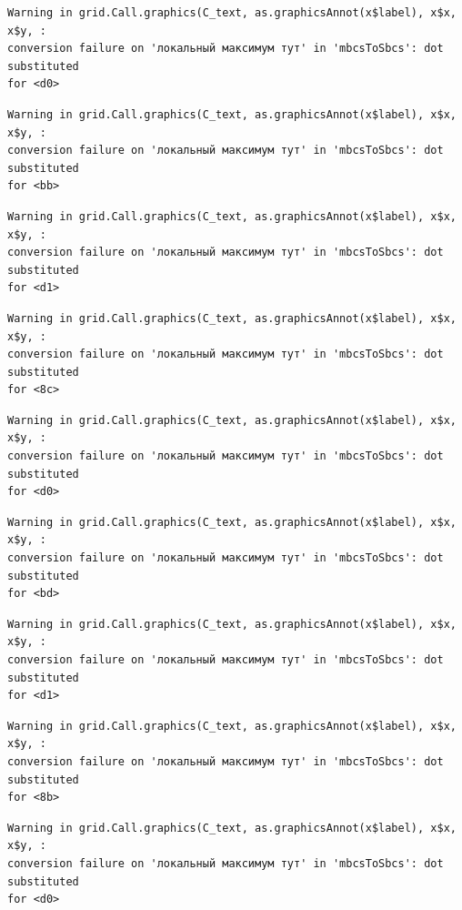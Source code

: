 \documentclass[
  letterpaper,
]{scrbook}
\theoremstyle{definition}
\theoremstyle{remark}
\begin{document}
\begin{verbatim}
Warning in grid.Call.graphics(C_text, as.graphicsAnnot(x$label), x$x, x$y, :
conversion failure on 'локальный максимум тут' in 'mbcsToSbcs': dot substituted
for <d0>
\end{verbatim}

\begin{verbatim}
Warning in grid.Call.graphics(C_text, as.graphicsAnnot(x$label), x$x, x$y, :
conversion failure on 'локальный максимум тут' in 'mbcsToSbcs': dot substituted
for <bb>
\end{verbatim}

\begin{verbatim}
Warning in grid.Call.graphics(C_text, as.graphicsAnnot(x$label), x$x, x$y, :
conversion failure on 'локальный максимум тут' in 'mbcsToSbcs': dot substituted
for <d1>
\end{verbatim}

\begin{verbatim}
Warning in grid.Call.graphics(C_text, as.graphicsAnnot(x$label), x$x, x$y, :
conversion failure on 'локальный максимум тут' in 'mbcsToSbcs': dot substituted
for <8c>
\end{verbatim}

\begin{verbatim}
Warning in grid.Call.graphics(C_text, as.graphicsAnnot(x$label), x$x, x$y, :
conversion failure on 'локальный максимум тут' in 'mbcsToSbcs': dot substituted
for <d0>
\end{verbatim}

\begin{verbatim}
Warning in grid.Call.graphics(C_text, as.graphicsAnnot(x$label), x$x, x$y, :
conversion failure on 'локальный максимум тут' in 'mbcsToSbcs': dot substituted
for <bd>
\end{verbatim}

\begin{verbatim}
Warning in grid.Call.graphics(C_text, as.graphicsAnnot(x$label), x$x, x$y, :
conversion failure on 'локальный максимум тут' in 'mbcsToSbcs': dot substituted
for <d1>
\end{verbatim}

\begin{verbatim}
Warning in grid.Call.graphics(C_text, as.graphicsAnnot(x$label), x$x, x$y, :
conversion failure on 'локальный максимум тут' in 'mbcsToSbcs': dot substituted
for <8b>
\end{verbatim}

\begin{verbatim}
Warning in grid.Call.graphics(C_text, as.graphicsAnnot(x$label), x$x, x$y, :
conversion failure on 'локальный максимум тут' in 'mbcsToSbcs': dot substituted
for <d0>
\end{verbatim}
\end{document}
